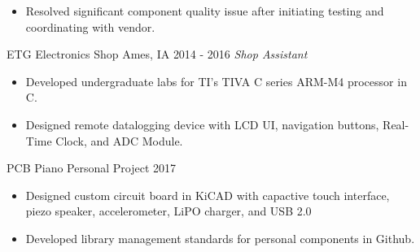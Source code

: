 \documentclass[]{bergman-cv} %
\begin{document}
\begin{entrylist}
{\begin{itemize}
	\item Resolved significant component quality issue after initiating testing and coordinating with vendor.
\end{itemize}}
\vspace{6pt}
\entry
{ETG Electronics Shop}
{Ames, IA}
{2014 - 2016}
{\emph{Shop Assistant}}
{\begin{itemize}	\setlength\itemsep{0.25em} \vspace*{-5pt}
	\item Developed undergraduate labs for TI's TIVA C series ARM-M4 processor in C.
	\item Designed remote datalogging device with LCD UI, navigation buttons, Real-Time Clock, and ADC Module.
\end{itemize}}
\vspace{6pt}
\entryFourItem
{PCB Piano}
{Personal Project}
{2017}
{\begin{itemize}	\setlength\itemsep{0.25em} \vspace*{-5pt}
	\item Designed custom circuit board in KiCAD with capactive touch interface, piezo speaker, accelerometer, LiPO charger, and USB 2.0
	\item Developed library management standards for personal components in Github.

\end{itemize}}
\end{entrylist}
\end{document}
